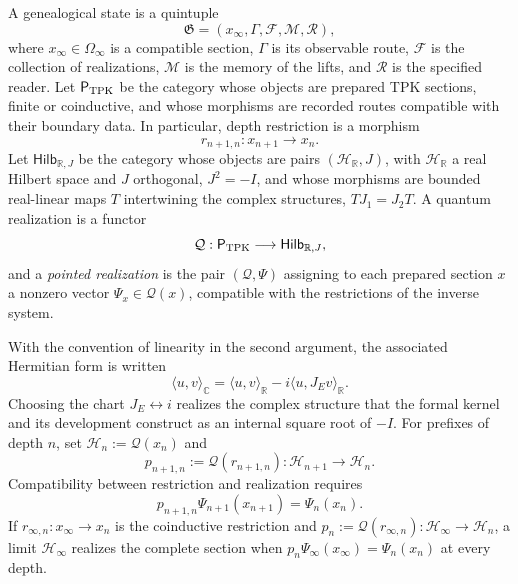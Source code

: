 \begin{definition}
\label{v:rec:realizacion_evolucion:statement:01}
A genealogical state is a quintuple
\begin{equation}
 \mathfrak G=(x_\infty,\Gamma,\mathcal F,\mathcal M,\mathcal R),
 \label{v:rec:eq:estado-genealogico-realizado-rev2}
\end{equation}
where \(x_\infty\in\Omega_\infty\) is a compatible section,
\(\Gamma\) is its observable route, \(\mathcal F\) is the collection of realizations,
\(\mathcal M\) is the memory of the lifts, and \(\mathcal R\) is the specified
reader. Let \(\mathsf P_{\rm TPK}\) be the category whose objects are
prepared TPK sections, finite or coinductive, and whose morphisms are
recorded routes compatible with their boundary data. In particular,
depth restriction is a morphism
\[
 r_{n+1,n}:x_{n+1}\longrightarrow x_n.
\]
Let \(\mathsf{Hilb}_{\mathbb R,J}\) be the category whose objects
are pairs \((\mathcal H_{\mathbb R},J)\), with \(\mathcal H_{\mathbb R}\)
a real Hilbert space and \(J\) orthogonal, \(J^2=-I\), and whose morphisms are
bounded real-linear maps \(T\) intertwining the complex
structures, \(TJ_1=J_2T\). A quantum realization is a functor
\[
 \mathcal Q:\mathsf P_{\rm TPK}\longrightarrow
 \mathsf{Hilb}_{\mathbb R,J},
\]
and a \emph{pointed realization} is the pair \((\mathcal Q,\Psi)\) assigning
to each prepared section \(x\) a nonzero vector
\(\Psi_x\in\mathcal Q(x)\), compatible with the restrictions of the inverse
system.
\end{definition}

With the convention of linearity in the second argument, the associated Hermitian form
is written
\[
 \langle u,v\rangle_{\mathbb C}
 =\langle u,v\rangle_{\mathbb R}
  -i\langle u,J_E v\rangle_{\mathbb R}.
\]
Choosing the chart \(J_E\leftrightarrow i\) realizes the complex structure that
the formal kernel and its development construct as an internal square root of \(-I\). For prefixes of
depth \(n\), set
\(\mathcal H_n:=\mathcal Q(x_n)\) and
\[
 p_{n+1,n}:=\mathcal Q(r_{n+1,n}):
 \mathcal H_{n+1}\longrightarrow\mathcal H_n.
\]
Compatibility between restriction and realization requires
\begin{equation}
 p_{n+1,n}\Psi_{n+1}(x_{n+1})=\Psi_n(x_n).
 \label{v:rec:eq:compatibilidad-realizacion-hilbert-rev2}
\end{equation}
If \(r_{\infty,n}:x_\infty\to x_n\) is the coinductive restriction and
\(p_n:=\mathcal Q(r_{\infty,n}):\mathcal H_\infty\to\mathcal H_n\), a
limit \(\mathcal H_\infty\) realizes the complete section when
\(p_n\Psi_\infty(x_\infty)=\Psi_n(x_n)\) at every depth.

